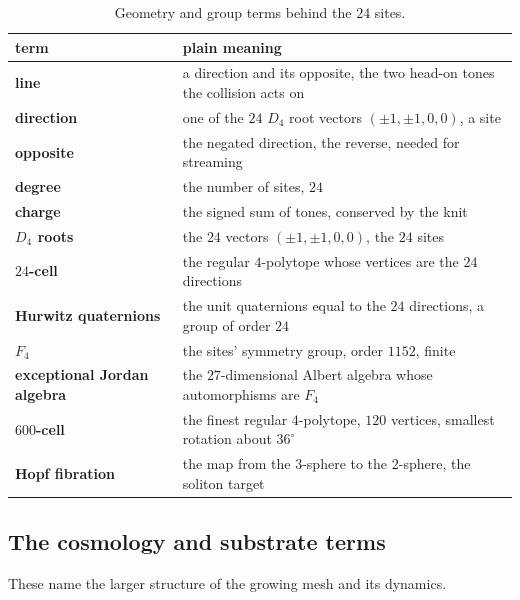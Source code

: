 \begin{table}[ht]
\centering
\begin{tabular}{@{}ll@{}}
\toprule
term & plain meaning \\
\midrule
\textbf{line} & a direction and its opposite, the two head-on tones the collision acts on \\
\textbf{direction} & one of the $24$ $D_4$ root vectors $(\pm 1, \pm 1, 0, 0)$, a site \\
\textbf{opposite} & the negated direction, the reverse, needed for streaming \\
\textbf{degree} & the number of sites, $24$ \\
\textbf{charge} & the signed sum of tones, conserved by the knit \\
\textbf{$D_4$ roots} & the $24$ vectors $(\pm 1, \pm 1, 0, 0)$, the $24$ sites \\
\textbf{$24$-cell} & the regular $4$-polytope whose vertices are the $24$ directions \\
\textbf{Hurwitz quaternions} & the unit quaternions equal to the $24$ directions, a group of order $24$ \\
\textbf{$F_4$} & the sites' symmetry group, order $1152$, finite \\
\textbf{exceptional Jordan algebra} & the $27$-dimensional Albert algebra whose automorphisms are $F_4$ \\
\textbf{$600$-cell} & the finest regular $4$-polytope, $120$ vertices, smallest rotation about $36^\circ$ \\
\textbf{Hopf fibration} & the map from the $3$-sphere to the $2$-sphere, the soliton target \\
\bottomrule
\end{tabular}
\caption{Geometry and group terms behind the $24$ sites.}
\label{tab:geometry}
\end{table}

\subsection{The cosmology and substrate terms}

These name the larger structure of the growing mesh and its dynamics.

